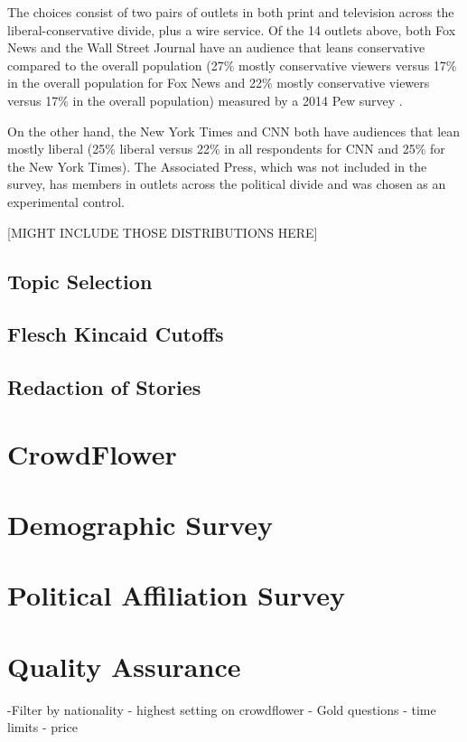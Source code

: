 The choices consist of two pairs of outlets in both print and television across the liberal-conservative divide, plus a wire service. Of the 14 outlets above, both Fox News and the Wall Street Journal have an audience that leans conservative compared to the overall population (27\% mostly conservative viewers versus 17\% in the overall population for Fox News and 22\% mostly conservative viewers versus 17\% in the overall population) measured by a 2014 Pew survey \cite{PoliticalPolarization}.

On the other hand, the New York Times and CNN both have audiences that lean mostly liberal (25\% liberal versus 22\% in all respondents for CNN and 25\% for the New York Times). The Associated Press, which was not included in the survey, has members in outlets across the political divide and was chosen as an experimental control. 

[MIGHT INCLUDE THOSE DISTRIBUTIONS HERE]

\subsection {Topic Selection}
\subsection {Flesch Kincaid Cutoffs}
\subsection {Redaction of Stories}

 

\section{CrowdFlower}
\section{Demographic Survey}
\section{Political Affiliation Survey}
\section{Quality Assurance}
-Filter by nationality
- highest setting on crowdflower
- Gold questions
- time limits
- price